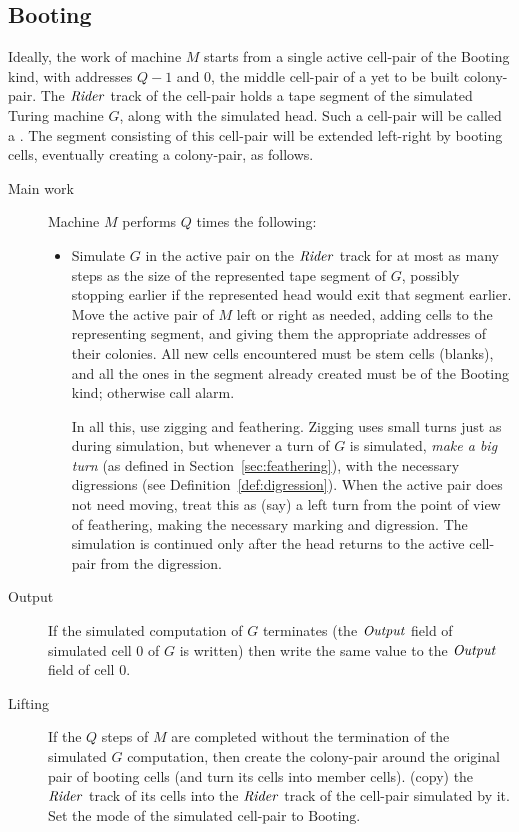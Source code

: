 \documentclass[11pt]{memoir}
\theoremstyle{definition} %
\newcommand{\fld}[1]{\ensuremath{\textit{#1\/}}}
\def\G{G} %
\newcommand{\Q}{Q} %
\newcommand{\Output}{\fld{Output}}
\newcommand{\Rider}{\fld{Rider}} %
\newcommand{\Booting}{\mathrm{Booting}}
\begin{document}
\subsection{Booting}\label{sec:booting}

Ideally, the work of machine \( M \) starts from a single active cell-pair of the Booting kind,
with addresses \( \Q-1 \) and 0, the middle cell-pair of a yet to be built colony-pair.
The \( \Rider \) track of the cell-pair holds a tape segment of the simulated Turing machine \( \G \),
along with the simulated head.
Such a cell-pair will be called a .
The segment consisting of this cell-pair will be extended left-right by booting cells,
eventually creating a colony-pair, as follows.

\begin{description}
  \item[Main work]
Machine \( M \) performs \( \Q \) times the following:
\begin{itemize}
\item[] 
  Simulate \( \G \) in the active pair on the \( \Rider \) track
  for at most as many steps as the size of the represented
  tape segment of \( \G \), possibly stopping earlier if the represented head would exit that
  segment earlier.
  Move the active pair of \( M \) left or right as needed,
  adding cells to the representing segment, and giving them the appropriate addresses of their colonies.
  All new cells encountered must be stem cells (blanks), and all the ones in the segment already created
  must be of the Booting kind; otherwise call alarm.

  In all this, use zigging and feathering.
  Zigging uses small turns just as during simulation, but 
  whenever a turn of \( \G \) is simulated, \emph{make a big turn}
  (as defined in Section~\ref{sec:feathering}), with the necessary
  digressions (see Definition~\ref{def:digression}).
  When the active pair does not need moving, treat this as (say) a left turn from the
  point of view of feathering, making the necessary marking and digression.
  The simulation is continued only after the head returns to the active cell-pair from the digression.
  
\end{itemize}
\item[Output]
If the simulated computation of \( \G \) terminates (the \( \Output \)
field of simulated cell 0 of \( \G \) is written)
then write the same value to the \( \Output \) field of cell 0.
\item[Lifting]
  If the \( \Q \) steps of \( M \) are completed without the termination of the simulated
  \( \G \) computation, then
  create the colony-pair around the original pair of booting cells (and turn its cells into member cells).
  (copy) the \( \Rider \) track of its cells into
  the \( \Rider \) track of the cell-pair simulated by it.
  Set the mode of the simulated cell-pair to \( \Booting \).
\end{description}
\end{document}
